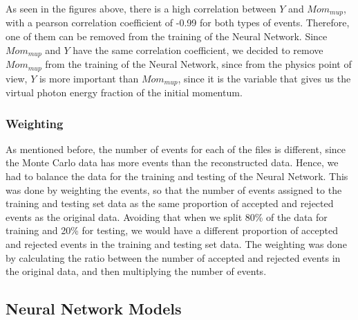 \documentclass{article}
\begin{document}
As seen in the figures above, there is a high correlation between $Y$ and $Mom_{mup}$, with
a pearson correlation coefficient of -0.99 for both types of events. Therefore, one of them can be removed from the training
of the Neural Network. Since $Mom_{mup}$ and $Y$ have the same correlation coefficient, we decided to remove $Mom_{mup}$ from the training of the Neural Network,
since from the physics point of view, $Y$ is more important than $Mom_{mup}$, since it is the variable that gives us the virtual photon energy fraction of the initial momentum. 

\subsubsection*{Weighting}
As mentioned before, the number of events for each of the files is different, since the Monte Carlo data has more events than the reconstructed data.
Hence, we had to balance the data for the training and testing of the Neural Network. This was done by weighting the events, so that the number of events
assigned to the training and testing set data as the same proportion of accepted and rejected events as the original data. Avoiding that when we split 
80\% of the data for training and 20\% for testing, we would have a different proportion of accepted and rejected events in the training and testing set data.
The weighting was done by calculating the ratio between the number of accepted and rejected events in the original data, and then multiplying the number of events.


\subsection*{Neural Network Models}
\end{document}
